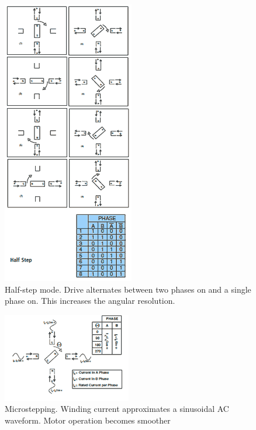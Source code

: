 \documentclass{instructions}
\begin{document}
\begin{figure}[h!]
    \centering
    \includegraphics[width=0.4\linewidth]{figs/halfstep.png}
    \caption{Half-step mode. Drive alternates between two phases on and a
single phase on. This increases the angular resolution.}
    \label{halfstep}
\end{figure}


\begin{figure}[h!]
    \centering
    \includegraphics[width=0.4\linewidth]{figs/microstep.png}
    \caption{Microstepping. Winding current approximates a sinusoidal AC
waveform. Motor operation becomes smoother}
    \label{microstep}
\end{figure}
\end{document}
